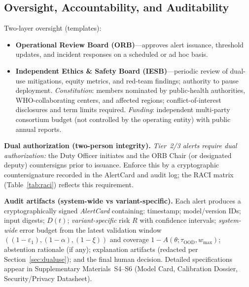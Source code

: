 \documentclass[11pt]{article}
\begin{document}
\subsection{Oversight, Accountability, and Auditability}
\label{sec:oversight}
Two-layer oversight (templates):
\begin{itemize}[leftmargin=*, itemsep=2pt, topsep=2pt]
\item \textbf{Operational Review Board (ORB)}—approves alert issuance, threshold updates, and incident responses on a scheduled or ad hoc basis.
\item \textbf{Independent Ethics \& Safety Board (IESB)}—periodic review of dual-use mitigations, equity metrics, and red-team findings; authority to pause deployment. \emph{Constitution}: members nominated by public-health authorities, WHO-collaborating centers, and affected regions; conflict-of-interest disclosures and term limits required. \emph{Funding}: independent multi-party consortium budget (not controlled by the operating entity) with public annual reports.
\end{itemize}

\noindent\textbf{Dual authorization (two-person integrity).}
\emph{Tier 2/3 alerts require dual authorization:} the Duty Officer initiates and the ORB Chair (or designated deputy) countersigns prior to issuance. Enforce this by a cryptographic countersignature recorded in the AlertCard and audit log; the RACI matrix (Table~\ref{tab:raci}) reflects this requirement.

\noindent\textbf{Audit artifacts (system-wide vs variant-specific).}
Each alert produces a cryptographically signed \emph{AlertCard} containing: timestamp; model/version IDs; input digests; $D(t)$; \emph{variant-specific} risk $R$ with confidence intervals; \emph{system-wide} error budget from the latest validation window $((1-\varepsilon_1),(1-\alpha),(1-\xi))$ and coverage $1-A(\theta;\tau_{\text{OOD}},w_{\max})$; abstention rationale (if any); explanation artifacts (redacted per Section~\ref{sec:dualuse}); and the final human decision. Detailed specifications appear in Supplementary Materials~S4--S6 (Model Card, Calibration Dossier, Security/Privacy Datasheet).
\end{document}
